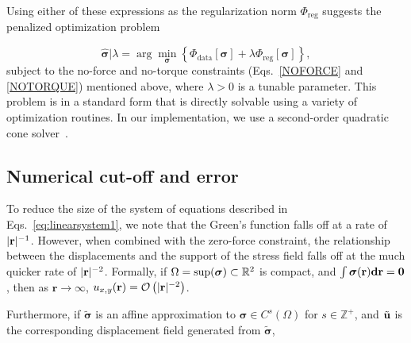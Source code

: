 \documentclass[aps,prl,reprint,twocolumn,groupedaddress,showpacs]{revtex4}
\DeclarePairedDelimiter{\norm}{\lVert}{\rVert}
\newcommand{\bsigma}{{\boldsymbol\sigma}}
\def\d{{\bf d}}
\def\r{{\bf r}}
\def\u{{\bf u}}
\begin{document}
Using either of these expressions as the regularization norm
$\Phi_{\textrm{reg}}$ suggests the penalized optimization problem

\begin{equation}
\hat{\bsigma} \big\vert \lambda = \arg\min_{\bsigma} \left\{ \Phi_{\textrm{data}}[\bsigma] + 
\lambda\Phi_{\textrm{reg}}[\bsigma] \right\},
\label{eq:objective}
\end{equation}
%
subject to the no-force and no-torque constraints (Eqs.~\ref{NOFORCE}
and \ref{NOTORQUE}) mentioned above, where $\lambda>0$ is a tunable
parameter. This problem is in a standard form that is directly
solvable using a variety of optimization routines.  In our
implementation, we use a second-order quadratic cone solver~\cite{cvxpy}.

\subsection{Numerical cut-off and error}
To reduce the size of the system of equations described in
Eqs.~\ref{eq:linearsystem1}, we note that the Green's function falls
off at a rate of $|\r|^{-1}$. However, when combined with the
zero-force constraint, the relationship between the
displacements and the support of the stress field falls off at the
much quicker rate of $|\r|^{-2}$. Formally, if 
%
%
$\Omega = {\rm sup}(\bsigma)\subset \mathbb{R}^2$ is compact, and
 $\int \bsigma(\r)\d\r = \mathbf{0}$, then
as $\mathbf{r}\to\infty$, $u_{x,y}(\r) = \mathcal{O}\left( |\r|^{-2} \right)$.


Furthermore, if $\tilde{\bsigma}$ is an affine approximation to
$\bsigma\in C^s(\Omega)$ for $s\in\mathbb{Z}^+$, and $\tilde{\u}$ is
the corresponding displacement field generated from $\tilde{\bsigma}$,
\end{document}
